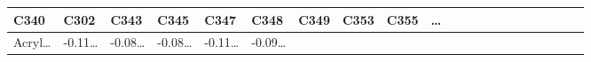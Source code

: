 \documentclass[
]{article}
\begin{document}
\begin{longtable}[]{@{}lllllllllllllllllllll@{}}
\begin{minipage}[b]{0.03\columnwidth}
C340\strut
\end{minipage} & \begin{minipage}[b]{0.03\columnwidth}\raggedright
C302\strut
\end{minipage} & \begin{minipage}[b]{0.03\columnwidth}\raggedright
C343\strut
\end{minipage} & \begin{minipage}[b]{0.03\columnwidth}\raggedright
C345\strut
\end{minipage} & \begin{minipage}[b]{0.03\columnwidth}\raggedright
C347\strut
\end{minipage} & \begin{minipage}[b]{0.03\columnwidth}\raggedright
C348\strut
\end{minipage} & \begin{minipage}[b]{0.03\columnwidth}\raggedright
C349\strut
\end{minipage} & \begin{minipage}[b]{0.03\columnwidth}\raggedright
C353\strut
\end{minipage} & \begin{minipage}[b]{0.03\columnwidth}\raggedright
C355\strut
\end{minipage} & \begin{minipage}[b]{0.01\columnwidth}\raggedright
\ldots{}\strut
\end{minipage}\tabularnewline
\midrule
\endhead
\begin{minipage}[t]{0.03\columnwidth}\raggedright
Acryl\ldots{}\strut
\end{minipage} & \begin{minipage}[t]{0.03\columnwidth}\raggedright
-0.11\ldots{}\strut
\end{minipage} & \begin{minipage}[t]{0.03\columnwidth}\raggedright
-0.08\ldots{}\strut
\end{minipage} & \begin{minipage}[t]{0.03\columnwidth}\raggedright
-0.08\ldots{}\strut
\end{minipage} & \begin{minipage}[t]{0.03\columnwidth}\raggedright
-0.11\ldots{}\strut
\end{minipage} & \begin{minipage}[t]{0.03\columnwidth}\raggedright
-0.09\ldots{}\strut
\end{minipage} & \begin{minipage}[t]{0.03\columnwidth}\raggedright

\end{minipage}
\end{longtable}
\end{document}
